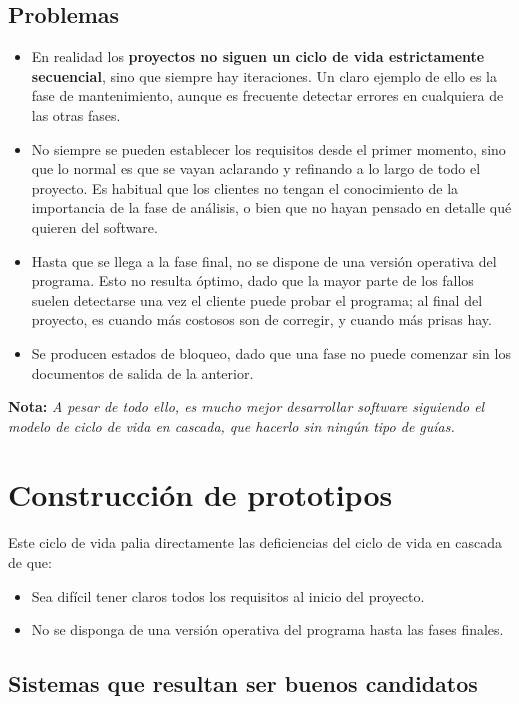 \subsection{Problemas}
\begin{itemize}
   \item En realidad los \textbf{proyectos no siguen un ciclo de vida estrictamente secuencial}, sino que siempre hay iteraciones. Un claro ejemplo de ello es la fase de mantenimiento, aunque es frecuente detectar errores en cualquiera de las otras fases. 
   \item No siempre se pueden establecer los requisitos desde el primer momento, sino que lo normal es que se vayan aclarando y refinando a lo largo de todo el proyecto. Es habitual que los clientes no tengan el conocimiento de la importancia de la fase de análisis, o bien que no hayan pensado en detalle qué quieren del software.
   \item Hasta que se llega a la fase final, no se dispone de una versión operativa del programa. Esto no resulta óptimo, dado que la mayor parte de los fallos suelen detectarse una vez el cliente puede probar el programa; al final del proyecto, es cuando más costosos son de corregir, y cuando más prisas hay.
   \item Se producen estados de bloqueo, dado que una fase no puede comenzar sin los documentos de salida de la anterior.
\end{itemize}

\textbf{Nota:} \textit{A pesar de todo ello, es mucho mejor desarrollar software siguiendo el modelo de ciclo de vida en cascada, que hacerlo sin ningún tipo de guías.}


\section{Construcción de prototipos}

Este ciclo de vida palia directamente las deficiencias del ciclo de vida en cascada de que:

\begin{itemize}
   \item Sea difícil tener claros todos los requisitos al inicio del proyecto.
   \item No se disponga de una versión operativa del programa hasta las fases finales.
\end{itemize}

\subsection{Sistemas que resultan ser buenos candidatos}

